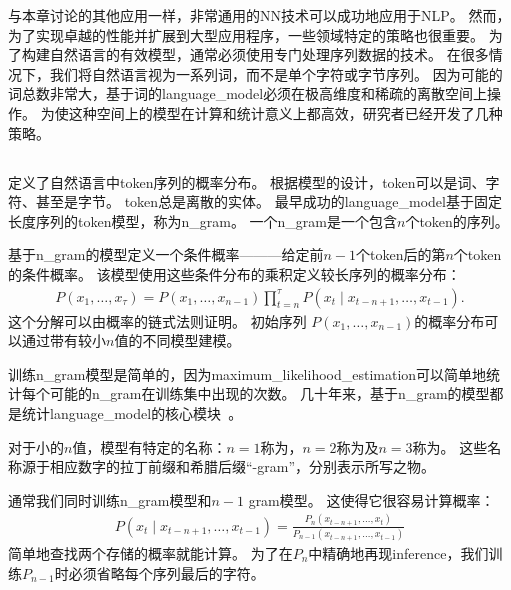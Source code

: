 
与本章讨论的其他应用一样，非常通用的\gls{NN}技术可以成功地应用于\gls{NLP}。
然而，为了实现卓越的性能并扩展到大型应用程序，一些领域特定的策略也很重要。
为了构建自然语言的有效模型，通常必须使用专门处理序列数据的技术。
在很多情况下，我们将自然语言视为一系列词，而不是单个字符或字节序列。
因为可能的词总数非常大，基于词的\gls{language_model}必须在极高维度和稀疏的离散空间上操作。
为使这种空间上的模型在计算和统计意义上都高效，研究者已经开发了几种策略。

\subsection{}
\label{sec:n_grams}

定义了自然语言中\gls{token}序列的概率分布。
根据模型的设计，\gls{token}可以是词、字符、甚至是字节。
\gls{token}总是离散的实体。
最早成功的\gls{language_model}基于固定长度序列的\gls{token}模型，称为\gls{n_gram}。
一个\gls{n_gram}是一个包含$n$个\gls{token}的序列。


基于\gls{n_gram}的模型定义一个条件概率———给定前$n-1$个\gls{token}后的第$n$个\gls{token}的条件概率。
该模型使用这些条件分布的乘积定义较长序列的概率分布：
\begin{align}
P(x_1, \dots, x_\tau) = P(x_1, \dots, x_{n-1}) \prod_{t=n}^\tau P(x_t \mid x_{t-n+1}, \dots, x_{t-1} ).
\end{align}
这个分解可以由概率的链式法则证明。
初始序列 $P(x_1, \dots, x_{n-1})$的概率分布可以通过带有较小$n$值的不同模型建模。

训练\gls{n_gram}模型是简单的，因为\gls{maximum_likelihood_estimation}可以简单地统计每个可能的\gls{n_gram}在训练集中出现的次数。                                                                                                                                                                                                                                                                                                                                                                                       
几十年来，基于\gls{n_gram}的模型都是统计\gls{language_model}的核心模块~\citep{Jelinek+Mercer80,Katz87,Chen+Goodman99}。

对于小的$n$值，模型有特定的名称：$n=1$称为，$n=2$称为及$n=3$称为。
这些名称源于相应数字的拉丁前缀和希腊后缀``-gram''，分别表示所写之物。


通常我们同时训练\gls{n_gram}模型和$n-1$ gram模型。 
这使得它很容易计算概率：
\begin{align}
\label{eq:ml-ngram}
P(x_t \mid x_{t-n+1}, \dots, x_{t-1}) = \frac{P_n(x_{t-n+1}, \dots, x_t)} { P_{n-1}( x_{t-n+1}, \dots, x_{t-1}) }
\end{align}
简单地查找两个存储的概率就能计算。
为了在$P_n$中精确地再现\gls{inference}，我们训练$P_{n-1}$时必须省略每个序列最后的字符。

